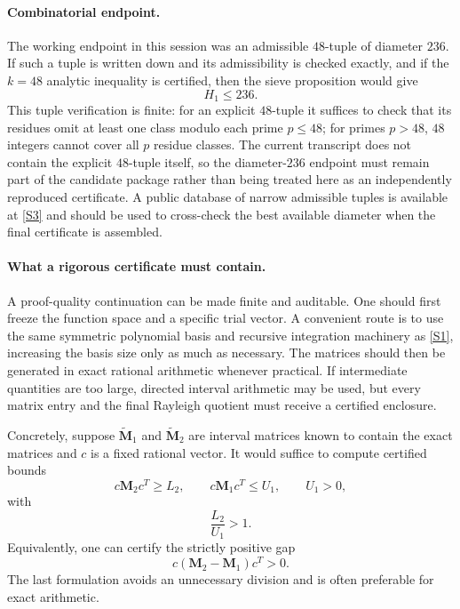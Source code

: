 \documentclass[11pt]{article}
\begin{document}
\paragraph{Combinatorial endpoint.}
The working endpoint in this session was an admissible $48$-tuple of diameter $236$.  If such a tuple is written down and its admissibility is checked exactly, and if the $k=48$ analytic inequality is certified, then the sieve proposition would give
\[
 \boxed{H_1\le236}.
\]
This tuple verification is finite: for an explicit $48$-tuple it suffices to check that its residues omit at least one class modulo each prime $p\le48$; for primes $p>48$, $48$ integers cannot cover all $p$ residue classes.  The current transcript does not contain the explicit $48$-tuple itself, so the diameter-$236$ endpoint must remain part of the candidate package rather than being treated here as an independently reproduced certificate.  A public database of narrow admissible tuples is available at \href{https://math.mit.edu/~primegaps/}{[S3]} and should be used to cross-check the best available diameter when the final certificate is assembled.

\paragraph{What a rigorous certificate must contain.}
A proof-quality continuation can be made finite and auditable.  One should first freeze the function space and a specific trial vector.  A convenient route is to use the same symmetric polynomial basis and recursive integration machinery as \href{https://arxiv.org/abs/2608.31126}{[S1]}, increasing the basis size only as much as necessary.  The matrices should then be generated in exact rational arithmetic whenever practical.  If intermediate quantities are too large, directed interval arithmetic may be used, but every matrix entry and the final Rayleigh quotient must receive a certified enclosure.

Concretely, suppose $\widetilde{\mathbf M}_1$ and $\widetilde{\mathbf M}_2$ are interval matrices known to contain the exact matrices and $c$ is a fixed rational vector.  It would suffice to compute certified bounds
\[
 c\mathbf M_2c^T\ge L_2,
 \qquad
 c\mathbf M_1c^T\le U_1,
 \qquad
 U_1>0,
\]
with
\[
 \frac{L_2}{U_1}>1.
\]
Equivalently, one can certify the strictly positive gap
\begin{equation}\label{eq:certificate-gap}
 c(\mathbf M_2-\mathbf M_1)c^T>0.
\end{equation}
The last formulation avoids an unnecessary division and is often preferable for exact arithmetic.
\end{document}
